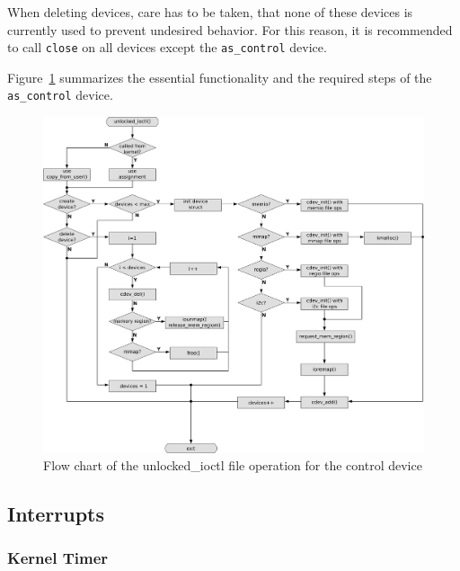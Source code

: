 When deleting devices, care has to be taken, that none of these devices is currently used to prevent undesired behavior.
For this reason, it is recommended to call \texttt{close} on all devices except the \texttt{as\_control} device.


Figure~\ref{fig:control-dev} summarizes the essential functionality and the required steps of the \texttt{as\_control} device.

\begin{figure}[ht]
    \centering
    \includegraphics[width=\textwidth,height=\textheight,keepaspectratio]{figs/control_dev.png}
    \caption{Flow chart of the unlocked\_ioctl file operation for the control device}
    \label{fig:control-dev}
\end{figure}


\subsection{Interrupts}
\label{device_driver:interrupts}

\subsubsection{Kernel Timer}

